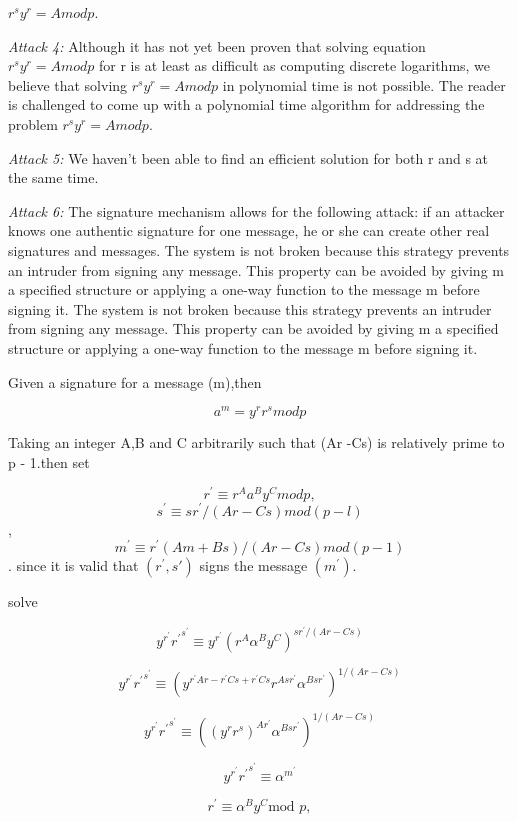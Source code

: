 	$ r^{s}y^{r} = A mod p$.
	
\textit{Attack 4:} Although it has not yet been proven that solving equation $ r^{s}y^{r} = A mod p$ for r is at least as difficult as computing discrete logarithms, we believe that solving $ r^{s}y^{r} = A mod p$ in polynomial time is not possible. The reader is challenged to come up with a polynomial time algorithm for addressing the problem $ r^{s}y^{r} = A mod p$. 

\textit{Attack 5:} We haven't been able to find an efficient solution for both r and s at the same time.

\textit{Attack 6:} The signature mechanism allows for the following attack: if an attacker knows one authentic signature for one message, he or she can create other real signatures and messages. The system is not broken because this strategy prevents an intruder from signing any message. This property can be avoided by giving m a specified structure or applying a one-way function to the message m before signing it.
The system is not broken because this strategy prevents an intruder from signing any message. This property can be avoided by giving m a specified structure or applying a one-way function to the message m before signing it.

Given a signature for a message (m),then
 
 $$a^{m} = y^{r}r^{s}mod p$$
 
Taking an integer A,B and C  arbitrarily such that (Ar -Cs) is relatively prime to p - 1.then set

$$r^{'} \equiv r^{A}a^{B}y^{C} mod p,$$
$$s^{'} \equiv sr^{'}/(Ar - Cs)mod(p - l)$$,
$$m^{'} \equiv r^{'}(Am + Bs)/(Ar - Cs)mod(p - 1)$$. 
since it is valid that $(r^{'},s{'})$ signs the message $(m^{'})$.

solve

$$y^{r^{\prime}}{r^{\prime}}^{s^{\prime}} \equiv y^{r^{\prime}}\left(r^{A}{\alpha^{B}y^{C}}\right)^{{sr^{\prime}}/(Ar-Cs)} $$

$$y^{r^{\prime}}{r^{\prime}}^{s^{\prime}} \equiv \left(y^{r^{\prime}{Ar-r^{\prime}{Cs+r^{\prime}Cs}}}r^{Asr^{\prime}}\alpha^{Bsr^{\prime}} \right)^{1/(Ar-Cs)} $$

$$y^{r^{\prime}}{r^{\prime}}^{s^{\prime}} \equiv \left(\left(y^{r}r^{s} \right)^{Ar^{\prime}}\alpha^{Bsr^{\prime}}\right)^{1/(Ar-Cs)} $$

$$y^{r^{\prime}}{r^{\prime}}^{s^{\prime}} \equiv \alpha^{m^{\prime}} $$

$$r^{\prime} \equiv {\alpha^{B}}{y^{C}}{\text{mod}\,\,p}, $$


